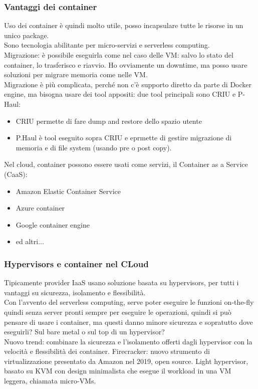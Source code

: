\documentclass[16px]{article}
\begin{document}
\subsubsection{Vantaggi dei container}
Uso dei container è quindi molto utile, posso incapsulare tutte le risorse in un unico package.\\ Sono tecnologia abilitante per micro-servizi e serverless computing.\\
Migrazione: è possibile eseguirla come nel caso delle VM: salvo lo stato del container, lo trasferisco e riavvio. Ho ovviamente un downtime, ma posso usare soluzioni per migrare memoria come nelle VM.\\ Migrazione è più complicata, perché non c'è supporto diretto da parte di Docker engine, ma bisogna usare dei tool appositi: due tool principali sono CRIU e P-Haul:
\begin{itemize}
\item CRIU permette di fare dump and restore dello spazio utente
\item P.Haul è tool eseguito sopra CRIU e eprmette di gestire migrazione di memoria e di file system (usando pre o post copy).
\end{itemize}
Nel cloud, container possono essere usati come servizi, il Container as a Service (CaaS):
\begin{itemize}
\item Amazon Elastic Container Service
\item Azure container
\item Google container engine
\item ed altri...
\end{itemize}
\subsubsection{Hypervisors e container nel CLoud}
Tipicamente provider IaaS usano soluzione basata su hypervisors, per tutti i vantaggi su sicurezza, isolamento e flessibilità.\\ Con l'avvento del serverless computing, serve poter eseguire le funzioni on-the-fly quindi senza server pronti sempre per eseguire le operazioni, quindi si può pensare di usare i container, ma questi danno minore sicurezza e sopratutto dove eseguirli? Sul bare metal o sul top di un hypervisor?\\ Nuovo trend: combinare la sicurezza e l'isolamento offerti dagli hypervisor con la velocità e flessibilità dei container. Firecracker: nuovo strumento di virtualizzazione presentato da Amazon nel 2019, open source. Light hypervisor, basato su KVM con design minimalista che esegue il workload in una VM leggera, chiamata micro-VMs.
\end{document}
